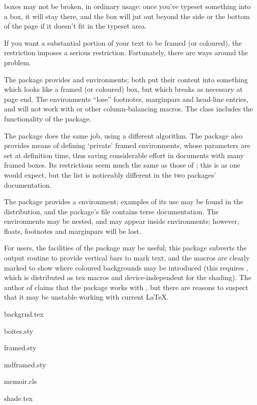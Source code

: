 
\AllTeX{} boxes may not be broken, in ordinary usage: once you've
typeset something into a box, it will stay there, and the box will jut
out beyond the side or the bottom of the page if it doesn't fit in the
typeset area.

If you want a substantial portion of your text to be framed (or
coloured), the restriction imposes a serious restriction.
Fortunately, there are ways around the problem.

The  package provides  and
 environments; both put their content into
something which looks like a framed (or coloured) box, but which
breaks as necessary at page end.  The environments ``lose'' footnotes,
marginpars and head-line entries, and will not work with
 or other column-balancing macros.  The
 class includes the functionality of the
 package.

The  package does the same job, using a different
algorithm.  The package also provides means of defining
`private' framed environments, whose parameters are set at definition
time, thus saving considerable effort in documents with many framed
boxes.  Its restrictions seem much the same as those of
; this is as one would expect, but the list is
noticeably different in the two packages' documentation.

The  package provides a 
environment; examples of its use may be found in the distribution, and
the package's  file contains terse documentation.  The
environments may be nested, and may appear inside
 environments; however, floats, footnotes and
marginpars will be lost.

For \plaintex{} users, the facilities of the 
package may be useful; this package subverts the output routine to
provide vertical bars to mark text, and the macros are clearly marked
to show where coloured backgrounds may be introduced (this requires
, which is distributed as tex macros and
device-independent \MF{} for the shading).  The author of
 claims that the package works with \LaTeXo{}, but
there are reasons to suspect that it may be unstable working with
current \LaTeX{}.
\begin{ctanrefs}
\item[backgrnd.tex]
\item[boites.sty]
\item[framed.sty]
\item[mdframed.sty]
\item[memoir.cls]
\item[shade.tex]
\end{ctanrefs}

